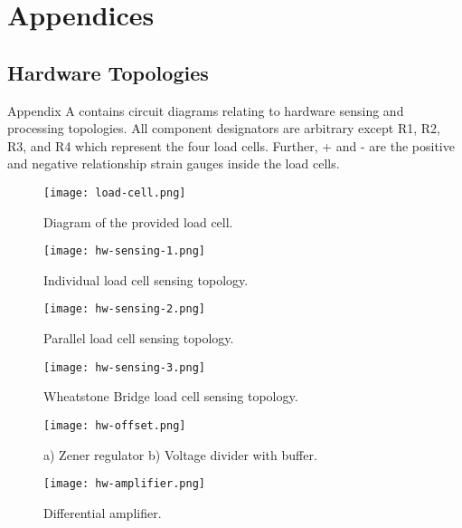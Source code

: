
\part{Appendices}

\chapter{Hardware Topologies}

Appendix A contains circuit diagrams relating to hardware sensing and processing topologies. All component designators are arbitrary except R1, R2, R3, and R4 which represent the four load cells. Further, + and - are the positive and negative relationship strain gauges inside the load cells.

\begin{figure}[!ht]
	\centering
	\texttt{[image: load-cell.png]}
	\caption{Diagram of the provided load cell.}
	\label{fig:load_cell}
\end{figure}

\begin{figure}[!ht]
	\centering
	\texttt{[image: hw-sensing-1.png]}
	\caption{Individual load cell sensing topology.}
	\label{fig:sense-1}
\end{figure}

\begin{figure}[!ht]
	\centering
	\texttt{[image: hw-sensing-2.png]}
	\caption{Parallel load cell sensing topology.}
	\label{fig:sense-2}
\end{figure}

\begin{figure}[!ht]
	\centering
	\texttt{[image: hw-sensing-3.png]}
	\caption{Wheatstone Bridge load cell sensing topology.}
	\label{fig:sense-3}
\end{figure}

\begin{figure}[!ht]
	\centering
	\texttt{[image: hw-offset.png]}
	\caption{a) Zener regulator b) Voltage divider with buffer.}
	\label{fig:offset}
\end{figure}

\begin{figure}[!ht]
	\centering
	\texttt{[image: hw-amplifier.png]}
	\caption{Differential amplifier.}
	\label{fig:amplifier}
\end{figure}

